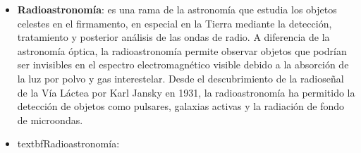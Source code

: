 
\begin{itemize}
    \item \textbf{Radioastronomía}: es una rama de la astronomía que estudia los objetos celestes
    en el firmamento, en especial en la Tierra mediante la detección, tratamiento
    y posterior análisis de las ondas de radio.
    A diferencia de la astronomía óptica, la radioastronomía permite observar
    objetos que podrían ser invisibles en el espectro electromagnético visible
    debido a la absorción de la luz por polvo y gas interestelar. Desde el
    descubrimiento de la radioseñal de la Vía Láctea por Karl Jansky en 1931, la
    radioastronomía ha permitido la detección de objetos como pulsares, galaxias
    activas y la radiación de fondo de microondas.

    \item textbf{Radioastronomía}:
\end{itemize}



